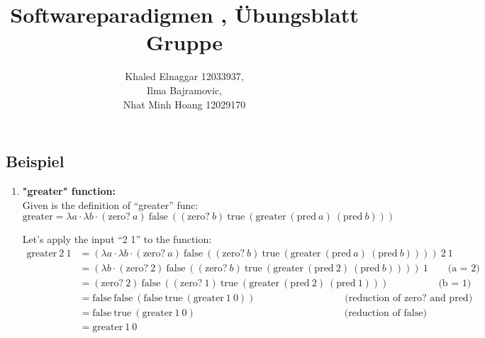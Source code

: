 \documentclass[10pt, a4paper]{article}
\author{Khaled Elnaggar 12033937,\\ Ilma Bajramovic, \\Nhat Minh Hoang 12029170}
\date{}
\title{
  Softwareparadigmen \Semester,
  Übungsblatt \AssignmentNumber \\
  Gruppe \GroupNumber
}
\newcounter{bsp}
\newcommand{\task}{\stepcounter{bsp}\subsection*{Beispiel \arabic{bsp}}}
\begin{document}
\pagestyle{plain}
\maketitle
 
\task

\begin{enumerate}
 \item \textbf{"greater" function:}\\
Given is the definition of ``greater'' func:
$$
\text{greater} = \lambda a \cdot \lambda b \cdot (\text{zero?} \ a) \ \text{false} \ ((\text{zero?} \ b) \ \text{true} \ (\text{greater} \ (\text{pred} \ a) \ (\text{pred} \ b)))
$$

Let's apply the input ``2 1'' to the function:
\begin{align*}
\text{greater} \ 2 \ 1 &= (\lambda a \cdot \lambda b \cdot (\text{zero?} \ a) \ \text{false} \ ((\text{zero?} \ b) \ \text{true} \ (\text{greater} \ (\text{pred} \ a) \ (\text{pred} \ b)))) \ 2 \ 1 \\
&= (\lambda b \cdot (\text{zero?} \ 2) \ \text{false} \ ((\text{zero?} \ b) \ \text{true} \ (\text{greater} \ (\text{pred} \ 2) \ (\text{pred} \ b)))) \ 1 
\quad \quad \text{(a = 2)} \\
&= (\text{zero?} \ 2) \ \text{false} \ ((\text{zero?} \ 1) \ \text{true} \ (\text{greater} \ (\text{pred} \ 2) \ (\text{pred} \ 1))) 
\quad \quad \quad \quad \quad      \text{(b = 1)} \\
&= \text{false} \ \text{false} \ (\text{false} \ \text{true} \ (\text{greater} \ 1 \ 0)) 
\quad \quad \quad \quad \quad \quad \quad \quad \quad \text{(reduction of zero? and pred)} \\
&= \text{false} \ \text{true} \ (\text{greater} \ 1 \ 0) 
\hspace{15em} \text{(reduction of false)} \\
&= \text{greater} \ 1 \ 0
\end{align*}


\end{enumerate}
\end{document}
